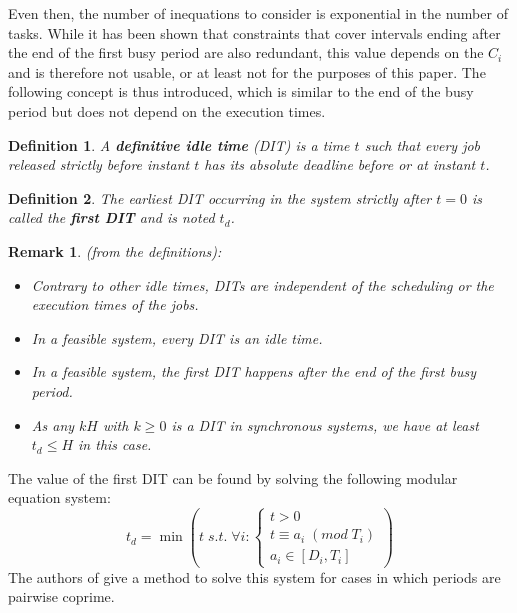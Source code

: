 \documentclass[conference]{IEEEtran}
\newtheorem{definition}{Definition}
\newtheorem{remark}{Remark}
\begin{document}
  Even then, the number of inequations to consider is exponential in the number
  of tasks. While it has been shown that constraints that cover intervals ending
  after the end of the first busy period are also redundant, this value depends on the $C_i$ and is
  therefore not usable, or at least not for the purposes of this paper. The
  following concept is thus introduced, which is similar to the end of the busy period but does not depend on the execution times.

  \begin{definition}
    A \textbf{definitive idle time} (DIT) is a time $t$ such that every job
    released strictly before instant $t$ has its absolute deadline before or at instant $t$.
  \end{definition}

  \begin{definition}
    The earliest DIT occurring in the system strictly after $t=0$ is called the
    \textbf{first DIT} and is noted $t_d$.
  \end{definition}

  \begin{remark} (from the definitions):
    \begin{itemize}
      \item Contrary to other idle times, DITs are independent of the
      scheduling or the execution times of the jobs.
      \item In a feasible system, every DIT is an idle time.
      \item In a feasible system, the first DIT happens after the end of the
      first busy period.
      \item As any $kH$ with $k \geqslant 0$ is a DIT in synchronous systems, we have at least $t_d
      \leqslant H$ in this case.
    \end{itemize}
  \end{remark}

  The value of the first DIT can be found by solving the following modular equation system:
  \[
    t_d = \min
    \left( t \; s.t. \; \forall i:
      \left\{
        \begin{array}{c}
          t > 0 \\
          t \equiv a_i \; (mod \; T_i) \\
          a_i \in [D_i, T_i]
        \end{array}
      \right.
    \right)
  \]
  The authors of \cite{george2009characterization} give a method to solve this system for cases in which periods are pairwise coprime.\\
\end{document}
